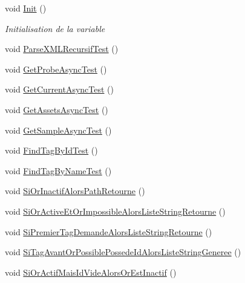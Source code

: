 \begin{DoxyCompactItemize}
\item 
void \mbox{\hyperlink{class_m_t_connect_agent_1_1_b_l_l_1_1_tests_1_1_m_t_connect_client_tests_ae181d3ad818f02ada1489c393a6109d0}{Init}} ()
\begin{DoxyCompactList}\small\item\em Initialisation de la variable \end{DoxyCompactList}\item 
void \mbox{\hyperlink{class_m_t_connect_agent_1_1_b_l_l_1_1_tests_1_1_m_t_connect_client_tests_af86def5de017752cbcf668fa09c88b59}{Parse\+X\+M\+L\+Recursif\+Test}} ()
\item 
void \mbox{\hyperlink{class_m_t_connect_agent_1_1_b_l_l_1_1_tests_1_1_m_t_connect_client_tests_ab0e768d5d05d6dec89274b402278403f}{Get\+Probe\+Async\+Test}} ()
\item 
void \mbox{\hyperlink{class_m_t_connect_agent_1_1_b_l_l_1_1_tests_1_1_m_t_connect_client_tests_a037621d2a50f4c0f4173d2314fc1cb15}{Get\+Current\+Async\+Test}} ()
\item 
void \mbox{\hyperlink{class_m_t_connect_agent_1_1_b_l_l_1_1_tests_1_1_m_t_connect_client_tests_aadab61890a4b36a405a5786d4183795b}{Get\+Assets\+Async\+Test}} ()
\item 
void \mbox{\hyperlink{class_m_t_connect_agent_1_1_b_l_l_1_1_tests_1_1_m_t_connect_client_tests_a332cf00c6230166a3ecb5d737cdc64f0}{Get\+Sample\+Async\+Test}} ()
\item 
void \mbox{\hyperlink{class_m_t_connect_agent_1_1_b_l_l_1_1_tests_1_1_m_t_connect_client_tests_a2ce138d6c1d226d4ce5b58d6b16846fa}{Find\+Tag\+By\+Id\+Test}} ()
\item 
void \mbox{\hyperlink{class_m_t_connect_agent_1_1_b_l_l_1_1_tests_1_1_m_t_connect_client_tests_ad7e1fd075ca20e8e80abf5e2c18c595b}{Find\+Tag\+By\+Name\+Test}} ()
\item 
void \mbox{\hyperlink{class_m_t_connect_agent_1_1_b_l_l_1_1_tests_1_1_m_t_connect_client_tests_a15ed0ae2e7431dd7d5e293da40e3f4d8}{Si\+Or\+Inactif\+Alors\+Path\+Retourne}} ()
\item 
void \mbox{\hyperlink{class_m_t_connect_agent_1_1_b_l_l_1_1_tests_1_1_m_t_connect_client_tests_ae9836699db3c3966233750df927069a2}{Si\+Or\+Active\+Et\+Or\+Impossible\+Alors\+Liste\+String\+Retourne}} ()
\item 
void \mbox{\hyperlink{class_m_t_connect_agent_1_1_b_l_l_1_1_tests_1_1_m_t_connect_client_tests_ac5a0bfeb3dd1dc2f2b5d8235a7bddb4c}{Si\+Premier\+Tag\+Demande\+Alors\+Liste\+String\+Retourne}} ()
\item 
void \mbox{\hyperlink{class_m_t_connect_agent_1_1_b_l_l_1_1_tests_1_1_m_t_connect_client_tests_a22ed7e734c0678f8fbcb037da9ad05cf}{Si\+Tag\+Avant\+Or\+Possible\+Possede\+Id\+Alors\+Liste\+String\+Generee}} ()
\item 
void \mbox{\hyperlink{class_m_t_connect_agent_1_1_b_l_l_1_1_tests_1_1_m_t_connect_client_tests_a27a0ad4eed0ad982ca3e93c793f6bb2c}{Si\+Or\+Actif\+Mais\+Id\+Vide\+Alors\+Or\+Est\+Inactif}} ()
\end{DoxyCompactItemize}
